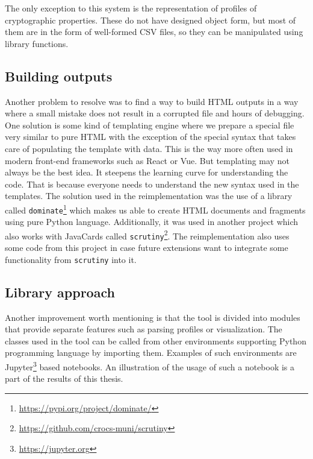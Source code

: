 The only exception to this system is the representation of profiles of cryptographic properties. These do not have designed object form, but most of them are in the form of well-formed CSV files, so they can be manipulated using library functions.


\subsection{Building outputs}
Another problem to resolve was to find a way to build HTML outputs in a way where a small mistake does not result in a corrupted file and hours of debugging. One solution is some kind of templating engine where we prepare a special file very similar to pure HTML with the exception of the special syntax that takes care of populating the template with data. This is the way more often used in modern front-end frameworks such as React or Vue. But templating may not always be the best idea. It steepens the learning curve for understanding the code. That is because everyone needs to understand the new syntax used in the templates. The solution used in the reimplementation was the use of a library called \texttt{dominate}\footnote{\url{https://pypi.org/project/dominate/}} which makes us able to create HTML documents and fragments using pure Python language. Additionally, it was used in another project which also works with JavaCards called \texttt{scrutiny}\footnote{\url{https://github.com/crocs-muni/scrutiny}}. The reimplementation also uses some code from this project in case future extensions want to integrate some functionality from \texttt{scrutiny} into it.

\subsection{Library approach}
Another improvement worth mentioning is that the tool is divided into modules that provide separate  features such as parsing profiles or visualization. The classes used in the tool can be called from other environments supporting Python programming language by importing them. Examples of such environments are Jupyter\footnote{\url{https://jupyter.org}} based notebooks. An illustration of the usage of such a notebook is a part of the results of this thesis.
